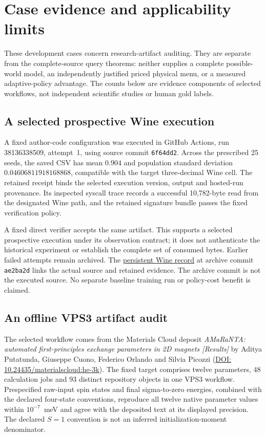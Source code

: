 \documentclass[pdflatex,sn-mathphys-num]{sn-jnl}
\theoremstyle{thmstyleone}
\theoremstyle{thmstylethree}
\theoremstyle{thmstyletwo}
\begin{document}
\section{Case evidence and applicability limits}\label{app:cases}
These development cases concern research-artifact auditing. They are separate from the complete-source query theorems: neither supplies a complete possible-world model, an independently justified priced physical menu, or a measured adaptive-policy advantage. The counts below are evidence components of selected workflows, not independent scientific studies or human gold labels.

\subsection{A selected prospective Wine execution}
A fixed author-code configuration was executed in GitHub Actions, run 38136338509, attempt~1, using source commit \texttt{6f64dd2}. Across the prescribed 25 seeds, the saved CSV has mean $0.904$ and population standard deviation $0.04606811918168868$, compatible with the target three-decimal Wine cell. The retained receipt binds the selected execution version, output and hosted-run provenance. Its inspected syscall trace records a successful 10,782-byte read from the designated Wine path, and the retained signature bundle passes the fixed verification policy.

A fixed direct verifier accepts the same artifact. This supports a selected prospective execution under its observation contract; it does not authenticate the historical experiment or establish the complete set of consumed bytes. Earlier failed attempts remain archived. The \href{https://github.com/SHiJiE1115/newproj/blob/ae2ba2d6bd62dd7e7152f519d49569b91d235a1d/WINE_HOSTED_RUNS.md}{persistent Wine record} at archive commit \texttt{ae2ba2d} links the actual source and retained evidence. The archive commit is not the executed source. No separate baseline training run or policy-cost benefit is claimed.

\subsection{An offline VPS3 artifact audit}
The selected workflow comes from the Materials Cloud deposit \emph{AMaRaNTA: automated first-principles exchange parameters in 2D magnets [Results]} by Aditya Putatunda, Giuseppe Cuono, Federico Orlando and Silvia Picozzi (\href{https://doi.org/10.24435/materialscloud:he-3k}{DOI: 10.24435/materialscloud:he-3k}). The fixed target comprises twelve parameters, 48 calculation jobs and 93 distinct repository objects in one VPS3 workflow. Prespecified raw-input spin states and final sigma-to-zero energies, combined with the declared four-state conventions, reproduce all twelve native parameter values within $10^{-7}$~meV and agree with the deposited text at its displayed precision. The declared $S=1$ convention is not an inferred initialization-moment denominator.
\end{document}
